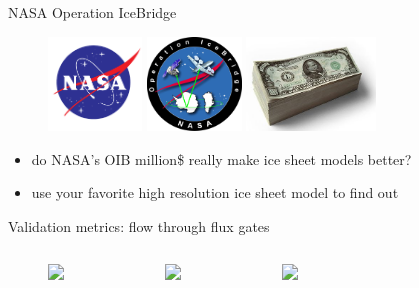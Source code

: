 \documentclass[hide notes,intlimits]{beamer}
\begin{document}
\begin{frame}{NASA Operation IceBridge}
  \begin{figure}
    \includegraphics[height=2.5cm]{nasa-logo} \qquad
    \includegraphics[height=2.5cm]{oib} \qquad
    \includegraphics[height=2.5cm]{1000-dollar-bills}
  \end{figure}
  \begin{itemize}
  \item do NASA's OIB million\$ really make ice sheet models better?
  \item use your favorite high resolution ice sheet model to find out
\end{itemize}
\end{frame}


\begin{frame}{Validation metrics: flow through flux gates}
  \vspace{-1em}
  \begin{columns}
    \column[c]{4cm}
    \begin{figure}
      \includegraphics<1>[width=3cm]{upernavik-gate-zoom}
    \end{figure}
    \begin{figure}
      \includegraphics<1>[width=4cm]{Kong_Oscar_Gletscher_velsurf_normal_profile_250m_greenland_2008-2009_grid_mo14_flow_sel_green}
    \end{figure}
    \column[c]{7cm}
    \begin{figure}
      \includegraphics<1>[height=7.5cm]{greenland-gates-29}
    \end{figure}
  \end{columns}
\end{frame}
\end{document}
